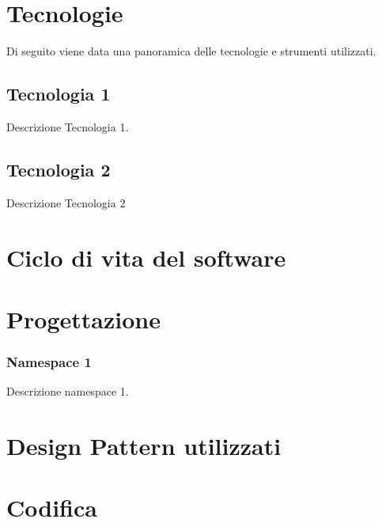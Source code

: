 \section{Tecnologie}
\label{sec:tecnologie-strumenti}

Di seguito viene data una panoramica delle tecnologie e strumenti utilizzati.

\subsection*{Tecnologia 1}
Descrizione Tecnologia 1.

\subsection*{Tecnologia 2}
Descrizione Tecnologia 2

\section{Ciclo di vita del software}
\label{sec:ciclo-vita-software}

\section{Progettazione}
\label{sec:progettazione}

\subsubsection{Namespace 1} %
Descrizione namespace 1.

\begin{namespacedesc}
\end{namespacedesc}


\section{Design Pattern utilizzati}

\section{Codifica}
